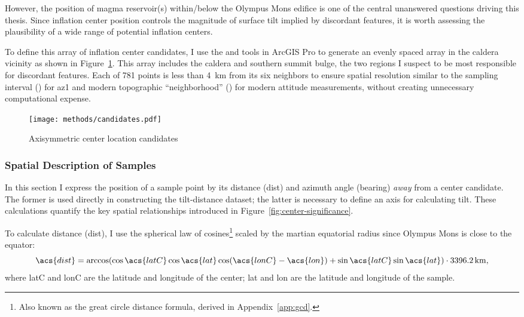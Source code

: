 However, the position of magma reservoir(s) within/below the Olympus Mons edifice is one of the central unanswered questions driving this thesis. Since inflation center position controls the magnitude of surface tilt implied by discordant features, it is worth assessing the plausibility of a wide range of potential inflation centers.

To define this array of inflation center candidates, I use the  and  tools in ArcGIS Pro to generate an evenly spaced array in the caldera vicinity as shown in Figure~\ref{fig:candidates}. This array includes the caldera and southern summit bulge, the two regions I suspect to be most responsible for discordant features. Each of 781 points is less than \qty{4}{\km} from its six neighbors to ensure spatial resolution similar to the sampling interval (\samplinginterval) for \acl{az1} and modern topographic ``neighborhood'' (\neighborhood) for modern attitude measurements, without creating unnecessary computational expense.

\begin{figure}
    \texttt{[image: methods/candidates.pdf]}%
    \caption{Axisymmetric center location candidates}%
    \label{fig:candidates}
\end{figure}

\subsubsection{Spatial Description of Samples}

In this section I express the position of a sample point by its distance (\acs{dist}) and azimuth angle (\acs{bearing}) \emph{away} from a center candidate. The former is used directly in constructing the tilt-distance dataset; the latter is necessary to define an axis for calculating tilt. These calculations quantify the key spatial relationships introduced in Figure~\ref{fig:center-significance}.

To calculate distance (\acs{dist}), I use the spherical law of cosines\footnote{Also known as the great circle distance formula, derived in Appendix~\ref{app:gcd}.} scaled by the martian equatorial radius since Olympus Mons is close to the equator:
\begin{equation}
    \acs{dist}=\arccos(\cos\acs{latC}\cos\acs{lat}\cos(\acs{lonC}-\acs{lon}) + \sin\acs{latC}\sin\acs{lat})\cdot\qty{3396.2}{\km},
\end{equation}
where \acs{latC} and \acs{lonC} are the latitude and longitude of the center; \acs{lat} and \acs{lon} are the latitude and longitude of the sample.

